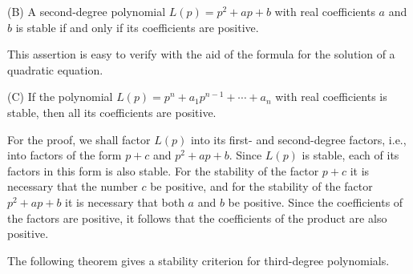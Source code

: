 \documentclass[10pt,a5paper]{book}
\theoremstyle{plain}
\theoremstyle{definition}
\theoremstyle{remark}
\begin{document}
(B) A second-degree polynomial $L(p)=p^{2}+a p+b$ with real coefficients $a$ and $b$ is stable if and only if its coefficients are positive.

This assertion is easy to verify with the aid of the formula for the solution of a quadratic equation.

(C) If the polynomial $L(p)=p^{n}+a_{1} p^{n-1}+\cdots+a_{n}$ with real coefficients is stable, then all its coefficients are positive.

For the proof, we shall factor $L(p)$ into its first- and second-degree factors, i.e., into factors of the form $p+c$ and $p^{2}+a p+b$. Since $L(p)$ is stable, each of its factors in this form is also stable. For the stability of the factor $p+c$ it is necessary that the number $c$ be positive, and for the stability of the factor $p^{2}+a p+b$ it is necessary that both $a$ and $b$ be positive. Since the coefficients of the factors are positive, it follows that the coefficients of the product are also positive.

The following theorem gives a stability criterion for third-degree polynomials.
\end{document}
